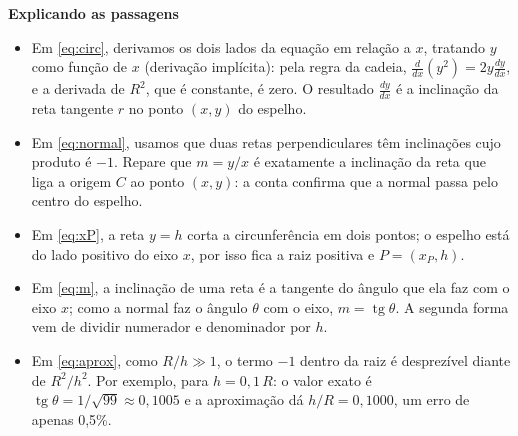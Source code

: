 \documentclass[11pt,a4paper]{article}
\DeclareMathOperator{\tg}{tg}
\newcommand{\titulocaixa}[1]{{\sffamily\bfseries\color{caixatitulo}#1}}
\begin{document}
\begin{comentario}
  \titulocaixa{Explicando as passagens}
  \begin{itemize}[leftmargin=12pt,labelsep=6pt]
    \item Em \eqref{eq:circ}, derivamos os dois lados da equação em relação a
      $x$, tratando $y$ como função de $x$ (derivação implícita): pela regra da
      cadeia, $\frac{d}{dx}(y^2) = 2y\frac{dy}{dx}$, e a derivada de $R^2$, que é
      constante, é zero. O resultado $\frac{dy}{dx}$ é a inclinação da reta
      tangente $r$ no ponto $(x, y)$ do espelho.
    \item Em \eqref{eq:normal}, usamos que duas retas perpendiculares têm
      inclinações cujo produto é $-1$. Repare que $m = y/x$ é exatamente a
      inclinação da reta que liga a origem $C$ ao ponto $(x, y)$: a conta
      confirma que a normal passa pelo centro do espelho.
    \item Em \eqref{eq:xP}, a reta $y = h$ corta a circunferência em dois pontos;
      o espelho está do lado positivo do eixo $x$, por isso fica a raiz positiva
      e $P = (x_P, h)$.
    \item Em \eqref{eq:m}, a inclinação de uma reta é a tangente do ângulo que
      ela faz com o eixo $x$; como a normal faz o ângulo $\theta$ com o eixo,
      $m = \tg\theta$. A segunda forma vem de dividir numerador e denominador
      por $h$.
    \item Em \eqref{eq:aprox}, como $R/h \gg 1$, o termo $-1$ dentro da raiz é
      desprezível diante de $R^2/h^2$. Por exemplo, para $h = 0{,}1\,R$: o valor
      exato é $\tg\theta = 1/\sqrt{99} \approx 0{,}1005$ e a aproximação dá
      $h/R = 0{,}1000$, um erro de apenas 0,5\%.
  \end{itemize}
\end{comentario}
\end{document}
